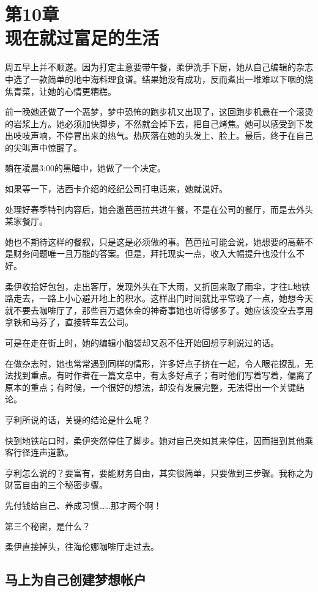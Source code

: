 \section[第10章\q 现在就过富足的生活]{第10章\\ 现在就过富足的生活}
\label{sec:ch10}

周五早上并不顺遂。因为打定主意要带午餐，柔伊洗手下厨，她从自己编辑的杂志中选了一款简单的地中海料理食谱。结果她没有成功，反而煮出一堆难以下咽的烧焦青菜，让她的心情更糟糕。

前一晚她还做了一个恶梦，梦中恐怖的跑步机又出现了，这回跑步机悬在一个滚烫的岩浆上方。她必须加快脚步，不然就会掉下去，把自己烤焦。她可以感受到下发出吱吱声响，不停冒出来的热气。热灰落在她的头发上、脸上。最后，终于在自己的尖叫声中惊醒了。

躺在凌晨3:00的黑暗中，她做了一个决定。

如果等一下，洁西卡介绍的经纪公司打电话来，她就说好。

处理好春季特刊内容后，她会邀芭芭拉共进午餐，不是在公司的餐厅，而是去外头某家餐厅。

她也不期待这样的餐叙，只是这是必须做的事。芭芭拉可能会说，她想要的高薪不是财务问题唯一且万能的答案。但是，拜托现实一点，收入大幅提升也没什么不好。

柔伊收拾好包包，走出客厅，发现外头在下大雨，又折回来取了雨伞，才往L地铁路走去，一路上小心避开地上的积水。这样出门时间就比平常晚了一点，她想今天就不要去咖啡厅了，那些百万退休金的神奇事她也听得够多了。她应该没空去享用拿铁和马芬了，直接转车去公司。

可是在走在街上时，她的编辑小脑袋却又忍不住开始回想亨利说过的话。

在做杂志时，她也常常遇到同样的情形，许多好点子挤在一起，令人眼花撩乱，无法找到重点。有时作者在一篇文章中，有太多好点子；有时他们写着写着，偏离了原本的重点；有时候，一个很好的想法，却没有发展完整，无法得出一个关键结论。

亨利所说的话，关键的结论是什么呢？

快到地铁站口时，柔伊突然停住了脚步。她对自己突如其来停住，因而挡到其他乘客行径连声道歉。

亨利怎么说的？要富有，要能财务自由，其实很简单，只要做到三步骤。我称之为财富自由的三个秘密步骤。

先付钱给自己、养成习惯……那才两个啊！

第三个秘密，是什么？

柔伊直接掉头，往海伦娜咖啡厅走过去。

\subsection{马上为自己创建梦想帐户}

